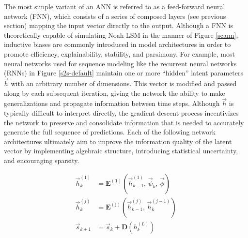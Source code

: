 The most simple variant of an ANN is referred to as a feed-forward neural network (FNN), which consists of a series of composed layers (see previous section) mapping the input vector directly to the output. Although a FNN is theoretically capable of simulating Noah-LSM in the manner of Figure \ref{scann}, inductive biases are commonly introduced in model architectures in order to promote efficiency, explainability, stability, and parsimony. For example, most neural networks used for sequence modeling like the recurrent neural networks (RNNs) in Figure \ref{s2s-default} maintain one or more ``hidden'' latent parameters $\vec{h}$ with an arbitrary number of dimensions. This vector is modified and passed along by each subsequent iteration, giving the network the ability to make generalizations and propagate information between time steps. Although $\vec{h}$ is typically difficult to interpret directly, the gradient descent process incentivizes the network to preserve and consolidate information that is needed to accurately generate the full sequence of predictions. Each of the following network architectures ultimately aim to improve the information quality of the latent vector by implementing algebraic structure, introducing statistical uncertainty, and encouraging sparsity.

\begin{equation}\label{eq_rnn}
    \begin{split}
        \vec{h}_k^{(1)} &= \mathbf{E^{(1)}}\left(\vec{h}_{k-1}^{(1)},\, \vec{\psi}_k,\, \vec{\phi}\right) \\
        \vec{h}_k^{(j)} &= \mathbf{E^{(j)}}\left(\vec{h}_{k-1}^{(j)},\, \vec{h}_k^{(j-1)}\right) \\
        \vec{s}_{k+1} &= \vec{s}_{k} + \mathbf{D}\left(h_k^{(L)}\right)
    \end{split}
\end{equation}

